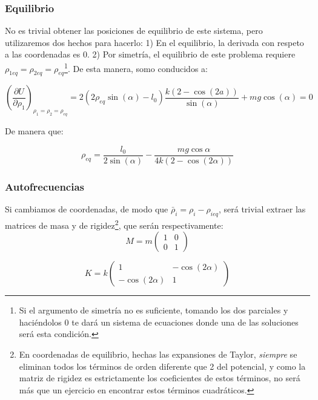 \documentclass[a4paper,12pt]{article}
\begin{document}
\subsubsection*{Equilibrio}

No es trivial obtener las posiciones de equilibrio de este sistema, pero utilizaremos dos hechos para hacerlo: 1) En el equilibrio, la derivada con respeto a las coordenadas es 0. 2) Por simetría, el equilibrio de este problema requiere $\rho_{1eq} = \rho_{2 eq} =\rho_{eq}$\footnote{Si el argumento de simetría no es suficiente, tomando los dos parciales y haciéndolos 0 te dará un sistema de ecuaciones donde una de las soluciones será esta condición.}. De esta manera, somo conducidos a:

$$\left(\frac{\partial U}{\partial \rho_1}\right)_{\rho_1 = \rho_2 = \rho_{eq}} = 2(2\rho_{eq} \sin(\alpha)-l_0)\frac{k(2-\cos(2a))}{\sin(\alpha)} + mg\cos{(\alpha)} = 0$$

De manera que:

\begin{equation}
\label{eq}
\rho_{eq} = \frac{l_0}{2\sin(\alpha)} - \frac{mg \cos{\alpha}}{4k(2-\cos{(2\alpha)})} 
\end{equation}

\subsubsection*{Autofrecuencias}
Si cambiamos de coordenadas, de modo que $\bar{\rho}_{i} = \rho_{i} - \rho_{i eq} $, será trivial extraer las matrices de masa y de rigidez\footnote{En coordenadas de equilibrio, hechas las expansiones de Taylor, \textit{siempre} se eliminan todos los términos de orden diferente que 2 del potencial, y como la matriz de rigidez es estrictamente los coeficientes de estos términos, no será más que un ejercicio en encontrar estos términos cuadráticos.}, que serán respectivamente: 
\begin{equation}
  M = m\begin{pmatrix}
    1&0\\0&1
  \end{pmatrix}
\end{equation}

\begin{equation}
  K = k\begin{pmatrix}
    1&-\cos{(2\alpha)}\\-\cos{(2\alpha)}&1
  \end{pmatrix}
\end{equation}
\end{document}
